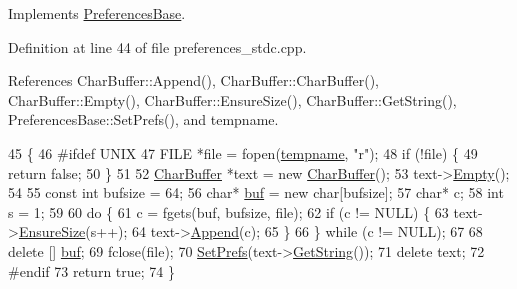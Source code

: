 Implements \hyperlink{classPreferencesBase_ab4e17e21f4377c44fa0ba16a0868a206}{Preferences\+Base}.



Definition at line 44 of file preferences\+\_\+stdc.\+cpp.



References Char\+Buffer\+::\+Append(), Char\+Buffer\+::\+Char\+Buffer(), Char\+Buffer\+::\+Empty(), Char\+Buffer\+::\+Ensure\+Size(), Char\+Buffer\+::\+Get\+String(), Preferences\+Base\+::\+Set\+Prefs(), and tempname.


\begin{DoxyCode}
45 \{
46 \textcolor{preprocessor}{#ifdef UNIX}
47     FILE *file = fopen(\hyperlink{preferences__stdc_8cpp_a7912698eed685a41c84e260ebb21d818}{tempname}, \textcolor{stringliteral}{"r"});
48     \textcolor{keywordflow}{if} (!file) \{
49         \textcolor{keywordflow}{return} \textcolor{keyword}{false};
50     \}
51 
52     \hyperlink{classCharBuffer}{CharBuffer} *text = \textcolor{keyword}{new} \hyperlink{classCharBuffer}{CharBuffer}();
53     text->\hyperlink{classCharBuffer_abe39d3fd7d8b9c8ec343af2cae7adc96}{Empty}();
54 
55     \textcolor{keyword}{const} \textcolor{keywordtype}{int} bufsize = 64;
56     \textcolor{keywordtype}{char}* \hyperlink{classPreferencesBase_a56ccdce81b9347c99eacb1839cee0a49}{buf} = \textcolor{keyword}{new} \textcolor{keywordtype}{char}[bufsize];
57     \textcolor{keywordtype}{char}* c;
58     \textcolor{keywordtype}{int} s = 1;
59 
60     \textcolor{keywordflow}{do} \{
61         c = fgets(buf, bufsize, file);
62         \textcolor{keywordflow}{if} (c != NULL) \{
63             text->\hyperlink{classCharBuffer_ad1907009b5ad136692b989fa96bf2f7e}{EnsureSize}(s++);
64             text->\hyperlink{classCharBuffer_a045b38735f7b3007c1b98d3d7b7feafe}{Append}(c);
65         \}
66     \} \textcolor{keywordflow}{while} (c != NULL);
67 
68     \textcolor{keyword}{delete} [] \hyperlink{classPreferencesBase_a56ccdce81b9347c99eacb1839cee0a49}{buf};
69     fclose(file);
70     \hyperlink{classPreferencesBase_a90dcd05552f94429b05df661eb72b5e2}{SetPrefs}(text->\hyperlink{classCharBuffer_a7dfd3feaaf80f318ba44efe15b1ec44b}{GetString}());
71     \textcolor{keyword}{delete} text;
72 \textcolor{preprocessor}{#endif}
73     \textcolor{keywordflow}{return} \textcolor{keyword}{true};
74 \}
\end{DoxyCode}



